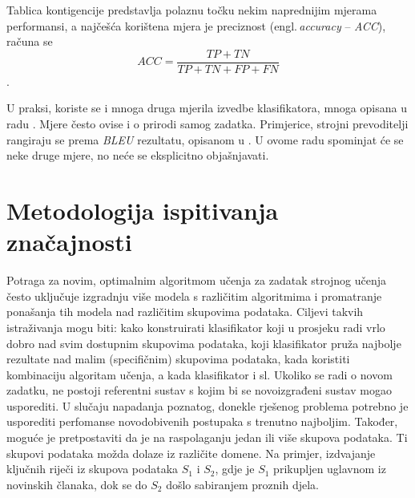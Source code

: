 Tablica kontigencije predstavlja polaznu točku nekim naprednijim mjerama performansi, a najčešća korištena mjera je preciznost (engl.\,\textit{accuracy} -- \textit{ACC}), računa se
\begin{equation}
ACC = \frac{TP + TN}{TP + TN + FP + FN}
\end{equation}.

U praksi, koriste se i mnoga druga mjerila izvedbe klasifikatora, mnoga opisana u radu \cite{powers2011evaluation}. Mjere često ovise i o prirodi samog zadatka. Primjerice, strojni prevoditelji rangiraju se prema \textit{BLEU} rezultatu, opisanom u \citep{papineni2002bleu}. U ovome radu spominjat će se neke druge mjere, no neće se eksplicitno objašnjavati. 

\section{Metodologija ispitivanja značajnosti}

Potraga za novim, optimalnim algoritmom učenja za zadatak strojnog učenja često uključuje izgradnju više modela s različitim algoritmima i promatranje ponašanja tih modela nad različitim skupovima podataka. Ciljevi takvih istraživanja mogu biti: kako konstruirati klasifikator koji u prosjeku radi vrlo dobro nad svim dostupnim skupovima podataka, koji klasifikator pruža najbolje rezultate nad malim (specifičnim) skupovima podataka, kada koristiti kombinaciju algoritam učenja, a kada klasifikator i sl. Ukoliko se radi o novom zadatku, ne postoji referentni sustav s kojim bi se novoizgrađeni sustav mogao usporediti. U slučaju napadanja poznatog, donekle rješenog problema potrebno je usporediti perfomanse novodobivenih postupaka s trenutno najboljim. Također, moguće je pretpostaviti da je na raspolaganju jedan ili više skupova podataka. Ti skupovi podataka možda dolaze iz različite domene. Na primjer, izdvajanje ključnih riječi iz skupova podataka $S_1$ i $S_2$, gdje je $S_1$ prikupljen uglavnom iz novinskih članaka, dok se do $S_2$ došlo sabiranjem proznih djela. 

